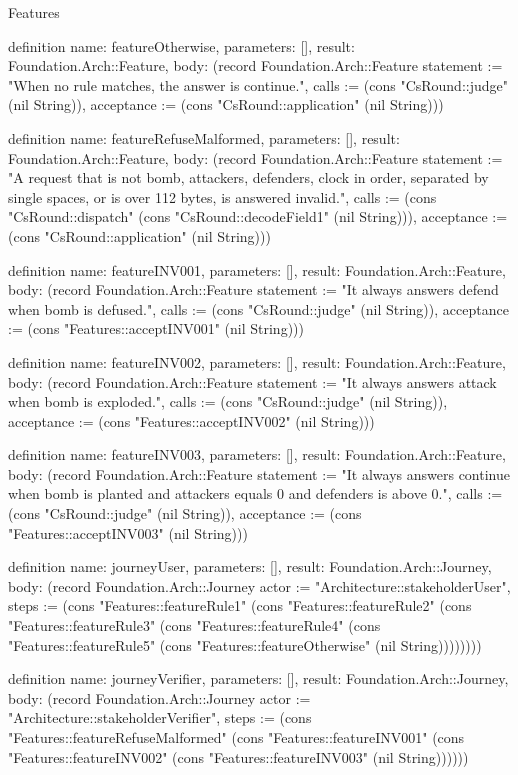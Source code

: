 \begin{lexlean}{Features}
\begin{semanticmodule}
definition{
  name: featureOtherwise,
  parameters: [],
  result: Foundation.Arch::Feature,
  body: (record Foundation.Arch::Feature {statement := "When no rule matches, the answer is continue.", calls := (cons "CsRound::judge" (nil String)), acceptance := (cons "CsRound::application" (nil String))})
}

definition{
  name: featureRefuseMalformed,
  parameters: [],
  result: Foundation.Arch::Feature,
  body: (record Foundation.Arch::Feature {statement := "A request that is not bomb, attackers, defenders, clock in order, separated by single spaces, or is over 112 bytes, is answered invalid.", calls := (cons "CsRound::dispatch" (cons "CsRound::decodeField1" (nil String))), acceptance := (cons "CsRound::application" (nil String))})
}

definition{
  name: featureINV001,
  parameters: [],
  result: Foundation.Arch::Feature,
  body: (record Foundation.Arch::Feature {statement := "It always answers defend when bomb is defused.", calls := (cons "CsRound::judge" (nil String)), acceptance := (cons "Features::acceptINV001" (nil String))})
}

definition{
  name: featureINV002,
  parameters: [],
  result: Foundation.Arch::Feature,
  body: (record Foundation.Arch::Feature {statement := "It always answers attack when bomb is exploded.", calls := (cons "CsRound::judge" (nil String)), acceptance := (cons "Features::acceptINV002" (nil String))})
}

definition{
  name: featureINV003,
  parameters: [],
  result: Foundation.Arch::Feature,
  body: (record Foundation.Arch::Feature {statement := "It always answers continue when bomb is planted and attackers equals 0 and defenders is above 0.", calls := (cons "CsRound::judge" (nil String)), acceptance := (cons "Features::acceptINV003" (nil String))})
}

definition{
  name: journeyUser,
  parameters: [],
  result: Foundation.Arch::Journey,
  body: (record Foundation.Arch::Journey {actor := "Architecture::stakeholderUser", steps := (cons "Features::featureRule1" (cons "Features::featureRule2" (cons "Features::featureRule3" (cons "Features::featureRule4" (cons "Features::featureRule5" (cons "Features::featureOtherwise" (nil String)))))))})
}

definition{
  name: journeyVerifier,
  parameters: [],
  result: Foundation.Arch::Journey,
  body: (record Foundation.Arch::Journey {actor := "Architecture::stakeholderVerifier", steps := (cons "Features::featureRefuseMalformed" (cons "Features::featureINV001" (cons "Features::featureINV002" (cons "Features::featureINV003" (nil String)))))})
}
\end{semanticmodule}
\end{lexlean}
